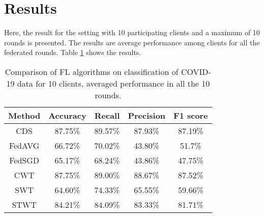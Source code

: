 \section{Results}



Here, the result for the setting with 10 participating clients and a maximum of 10 rounds is presented. The results are average performance among clients for all the federated rounds. Table \ref{best_performance} shows the results.


\begin{table}[h!]
\centering
\setlength{\tabcolsep}{5.5pt}
\renewcommand\arraystretch{1.12}
\caption{ \small Comparison of FL algorithms on classification of COVID-19 data for 10 clients, averaged performance in all the 10 rounds.}
\begin{tabular}{| *{5}{c|} }
\hline
Method & Accuracy & Recall & Precision & F1 score
\\
  \hline
  

CDS
 &87.75\%&89.57\% &87.93\% & 87.19\%  
\\   \hline  
FedAVG
 & 66.72\% &70.02\% &43.80\% & 51.7\%\\ 
 \hline  
FedSGD
 &65.17\% &68.24\%&43.86\%& 47.75\%  
 
 \\
 \hline  
CWT
 &87.75\%&89.00\%& 88.67\%&87.52\%\\
 
   \hline
 

SWT
 & 64.60\% &74.33\% & 65.55\% &59.66\% \\
    
\hline 
STWT
 & 84.21\% &84.09\%&83.33\% & 81.71\%  \\



\hline
\end{tabular}
\label{best_performance} 
\end{table}


